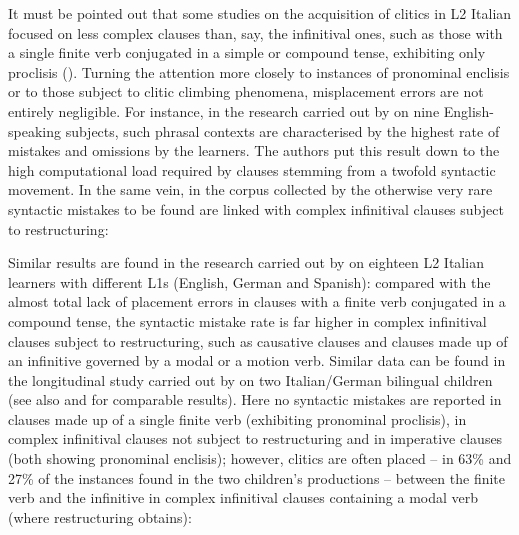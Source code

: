 \documentclass[output=paper,modfonts,nonflat,newtxmath]{langsci/langscibook}
\begin{document}
It must be pointed out that some studies on the acquisition of clitics in L2 Italian focused on less complex clauses than, say, the infinitival ones, such as those with a single finite verb conjugated in a simple or compound tense, exhibiting only proclisis (\citealt{LeoniniBelletti2004, Leonini2006}). Turning the attention more closely to instances of pronominal enclisis or to those subject to clitic climbing phenomena, misplacement errors are not entirely negligible. For instance, in the research carried out by \citet{GianniniCancila2006} on nine English-speaking subjects, such phrasal contexts are characterised by the highest rate of mistakes and omissions by the learners. The authors put this result down to the high computational load required by clauses stemming from a twofold syntactic movement. In the same vein, in the corpus collected by \citet{Berretta1986} the otherwise very rare syntactic mistakes to be found are linked with complex infinitival clauses subject to restructuring:
\z

\z


Similar results are found in the research carried out by \citet{BennatiMatteini2006} on eighteen L2 Italian learners with different L1s (English, German and Spanish): compared with the almost total lack of placement errors in clauses with a finite verb conjugated in a compound tense, the syntactic mistake rate is far higher in complex infinitival clauses subject to restructuring, such as causative clauses and clauses made up of an infinitive governed by a modal or a motion verb. Similar data can be found in the longitudinal study carried out by \citet{Ferrari2006} on two Italian/German bilingual children (see also \citealt{BernardiniTimofte2017} and \citealt{BernardiniWeijer2017} for comparable results). Here no syntactic mistakes are reported in clauses made up of a single finite verb (exhibiting pronominal proclisis), in complex infinitival clauses not subject to restructuring and in imperative clauses (both showing pronominal enclisis); however, clitics are often placed – in 63\% and 27\% of the instances found in the two children’s productions – between the finite verb and the infinitive in complex infinitival clauses containing a modal verb (where restructuring obtains):
\end{document}
